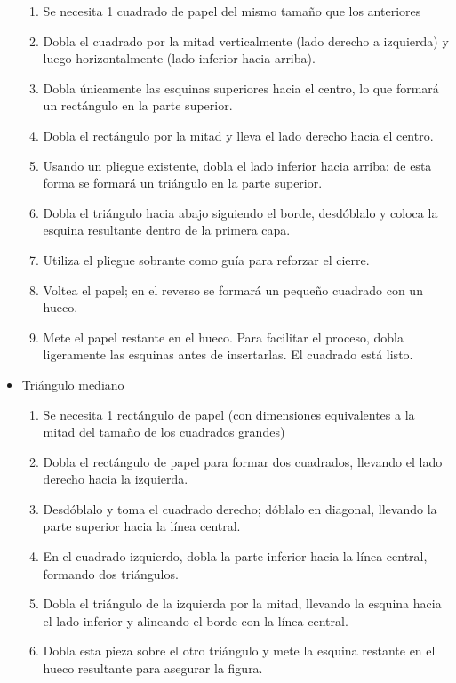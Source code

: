 \begin{itemize}
\begin{enumerate}
        \item Se necesita 1 cuadrado de papel del mismo tamaño que los anteriores
        \item Dobla el cuadrado por la mitad verticalmente (lado derecho a izquierda) y luego horizontalmente (lado inferior hacia arriba).  
        \item Dobla únicamente las esquinas superiores hacia el centro, lo que formará un rectángulo en la parte superior.  
        \item Dobla el rectángulo por la mitad y lleva el lado derecho hacia el centro.  
        \item Usando un pliegue existente, dobla el lado inferior hacia arriba; de esta forma se formará un triángulo en la parte superior.  
        \item Dobla el triángulo hacia abajo siguiendo el borde, desdóblalo y coloca la esquina resultante dentro de la primera capa.  
        \item Utiliza el pliegue sobrante como guía para reforzar el cierre.  
        \item Voltea el papel; en el reverso se formará un pequeño cuadrado con un hueco.  
        \item Mete el papel restante en el hueco. Para facilitar el proceso, dobla ligeramente las esquinas antes de insertarlas. El cuadrado está listo.
    \end{enumerate}
    
    \item Triángulo mediano
    \begin{enumerate}
        
        \item Se necesita 1 rectángulo de papel (con dimensiones equivalentes a la mitad del tamaño de los cuadrados grandes)
        \item Dobla el rectángulo de papel para formar dos cuadrados, llevando el lado derecho hacia la izquierda.  
        \item Desdóblalo y toma el cuadrado derecho; dóblalo en diagonal, llevando la parte superior hacia la línea central.  
        \item En el cuadrado izquierdo, dobla la parte inferior hacia la línea central, formando dos triángulos.  
        \item Dobla el triángulo de la izquierda por la mitad, llevando la esquina hacia el lado inferior y alineando el borde con la línea central.  
        \item Dobla esta pieza sobre el otro triángulo y mete la esquina restante en el hueco resultante para asegurar la figura.  
        

\end{enumerate}
\end{itemize}
